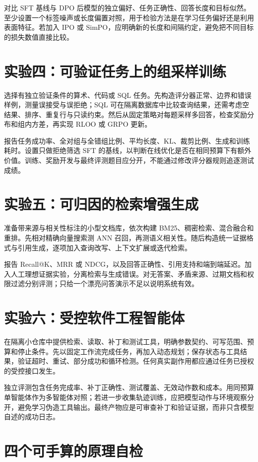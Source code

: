 对比 SFT 基线与 DPO 后模型的独立偏好、任务正确性、回答长度和目标似然。至少设置一个标签噪声或长度偏置对照，用于检验方法是在学习任务偏好还是利用表面特征。若加入 IPO 或 SimPO，应明确新的长度和间隔约定，避免把不同目标的损失数值直接比较。

\section{实验四：可验证任务上的组采样训练}

选择有独立验证条件的算术、代码或 SQL 任务。先构造评分器正常、边界和错误样例，测量误接受与误拒绝；SQL 可在隔离数据库中比较查询结果，还需考虑空结果、排序、重复行与只读约束。然后从固定策略对每题采样多回答，检查奖励分布和组内方差，再实现 RLOO 或 GRPO 更新。

报告任务成功率、全对组与全错组比例、平均长度、KL、裁剪比例、生成和训练耗时。设置只做拒绝筛选 SFT 的基线，以判断在线优化是否在相同预算下有额外价值。训练、奖励开发与最终评测题目应分开，不能通过修改评分器规则追逐测试成绩。

\section{实验五：可归因的检索增强生成}

准备带来源与相关性标注的小型文档库，依次构建 BM25、稠密检索、混合融合和重排。先相对精确向量搜索测 ANN 召回，再测语义相关性。随后构造统一证据格式与引用生成，逐项加入查询改写、上下文扩展或迭代检索。

报告 Recall@K、MRR 或 NDCG，以及回答正确性、引用支持和端到端延迟。加入人工理想证据实验，分离检索与生成错误。对无答案、矛盾来源、过期文档和权限过滤分别评测；只给一个漂亮问答演示不足以说明系统有效。

\section{实验六：受控软件工程智能体}

在隔离小仓库中提供检索、读取、补丁和测试工具，明确参数契约、可写范围、预算和停止条件。先以固定工作流完成任务，再加入动态规划；保存状态与工具结果，验证超时、重试、部分成功和循环检测。任何真实副作用都应通过任务已授权的受控接口发生。

独立评测包含任务完成率、补丁正确性、测试覆盖、无效动作数和成本。用同预算单智能体作为多智能体对照；若进一步收集轨迹训练，应把模型动作与环境观察分开，避免学习伪造工具输出。最终产物应是可审查补丁和验证证据，而非只含模型自述的成功日志。

\section{四个可手算的原理自检}

